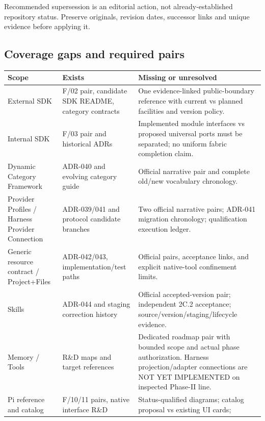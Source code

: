 \documentclass[
  10pt,
]{article}
\begin{document}
Recommended supersession is an editorial action, not already-established
repository status. Preserve originals, revision dates, successor links
and unique evidence before applying it.

\hypertarget{coverage-gaps-and-required-pairs}{%
\subsection{Coverage gaps and required
pairs}\label{coverage-gaps-and-required-pairs}}

\begin{longtable}[]{@{}>{\raggedright\arraybackslash}p{}>{\raggedright\arraybackslash}p{}>{\raggedright\arraybackslash}p{}@{}}
\toprule\noalign{}
Scope & Exists & Missing or unresolved \\
\midrule\noalign{}
\endhead
\bottomrule\noalign{}
\endlastfoot
External SDK & F/02 pair, candidate SDK README, category contracts & One
evidence-linked public-boundary reference with current vs planned
facilities and version policy. \\
Internal SDK & F/03 pair and historical ADRs & Implemented module
interfaces vs proposed universal ports must be separated; no uniform
fabric completion claim. \\
Dynamic Category Framework & ADR-040 and evolving category guide &
Official narrative pair and complete old/new vocabulary chronology. \\
Provider Profiles / Harness Provider Connection & ADR-039/041 and
protocol candidate branches & Two official narrative pairs; ADR-041
migration chronology; qualification execution ledger. \\
Generic resource contract / Project+Files & ADR-042/043,
implementation/test paths & Official pairs, acceptance links, and
explicit native-tool confinement limits. \\
Skills & ADR-044 and staging correction history & Official
accepted-version pair; independent 2C.2 acceptance;
source/version/staging/lifecycle evidence. \\
Memory / Tools & R\&D maps and target references & Dedicated roadmap
pair with bounded scope and actual phase authorization. Harness
projection/adapter connections are NOT YET IMPLEMENTED on inspected
Phase-II line. \\
Pi reference and catalog & F/10/11 pairs, native interface R\&D &
Status-qualified diagrams; catalog proposal vs existing UI cards;

\end{longtable}
\end{document}
